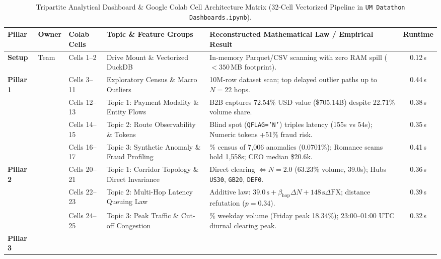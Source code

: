 \documentclass[11pt,a4paper]{article}
\begin{document}
\begin{table}[H]
\centering\scriptsize
\caption{Tripartite Analytical Dashboard \& Google Colab Cell Architecture Matrix (32-Cell Vectorized Pipeline in \texttt{UM Datathon Dashboards.ipynb}).}
\label{tab:colab_architecture}
\renewcommand{\arraystretch}{1.22}
\begin{tabularx}{\textwidth}{@{}l >{\raggedright\arraybackslash}p{1.4cm} >{\raggedright\arraybackslash}p{1.4cm} >{\raggedright\arraybackslash}p{3.8cm} >{\raggedright\arraybackslash}X c@{}}
\toprule
\textbf{Pillar} & \textbf{Owner} & \textbf{Colab Cells} & \textbf{Topic \& Feature Groups} & \textbf{Reconstructed Mathematical Law / Empirical Result} & \textbf{Runtime} \\ \midrule
\textbf{Setup} & Team & Cells 1--2 & Drive Mount \& Vectorized DuckDB & In-memory Parquet/CSV scanning with zero RAM spill ($<350$\,MB footprint). & 0.12\,s \\ \midrule
\multirow{4}{*}{\textbf{Pillar 1}} & \multirow{4}{*}{\textbf{Joy}} 
  & Cells 3--11 & Exploratory Census \& Macro Outliers & 10M-row dataset scan; top delayed outlier paths up to $N=22$ hops. & 0.44\,s \\
  & & Cells 12--13 & Topic 1: Payment Modality \& Entity Flows & B2B captures 72.54\% USD value (\$705.14B) despite 22.71\% volume share. & 0.38\,s \\
  & & Cells 14--15 & Topic 2: Route Observability \& Tokens & Blind spot (\texttt{QFLAG='N'}) triples latency (155s vs 54s); Numeric tokens +51\% fraud risk. & 0.35\,s \\
  & & Cells 16--17 & Topic 3: Synthetic Anomaly \& Fraud Profiling & 100\% census of 7,006 anomalies (0.0701\%); Romance scams hold 1,558s; CEO median \$20.6k. & 0.41\,s \\ \midrule
\multirow{3}{*}{\textbf{Pillar 2}} & \multirow{3}{*}{\textbf{Evan}} 
  & Cells 20--21 & Topic 1: Corridor Topology \& Direct Invariance & Direct clearing $\iff N=2.0$ (63.23\% volume, 39.0s); Hubs \texttt{US30}, \texttt{GB20}, \texttt{DEF0}. & 0.36\,s \\
  & & Cells 22--23 & Topic 2: Multi-Hop Latency Queuing Law & Additive law: $39.0\,\text{s} + \beta_{\text{hop}}\Delta N + 148\,\text{s}\Delta\text{FX}$; distance refutation ($p=0.34$). & 0.39\,s \\
  & & Cells 24--25 & Topic 3: Peak Traffic \& Cut-off Congestion & 88.82\% weekday volume (Friday peak 18.34\%); 23:00--01:00 UTC diurnal clearing peak. & 0.32\,s \\ \midrule
\multirow{3}{*}{\textbf{Pillar 3}} & \multirow{3}{*}{\textbf{Zhi Yin}} 

\end{tabularx}
\end{table}
\end{document}
